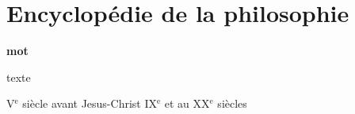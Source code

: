 
\section{Encyclopédie de la philosophie}

{\bf mot} 

\vspace{.7cm}

texte

{\footnotesize V}$^\text{e}$ siècle avant Jesus-Christ
{\footnotesize IX}$^\text{e}$  et au {\footnotesize XX}$^\text{e}$ siècles
